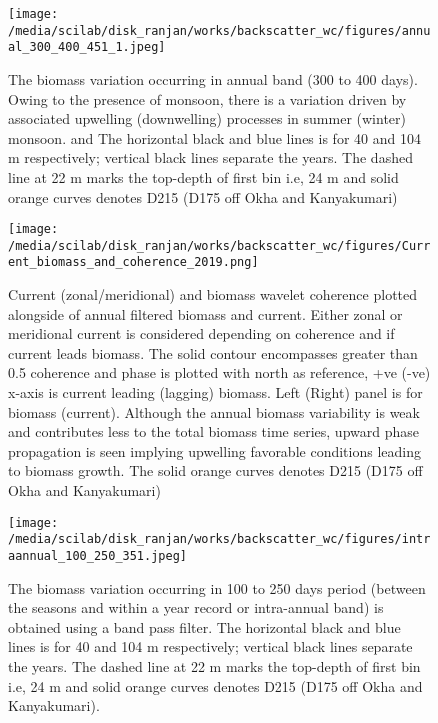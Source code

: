 \documentclass{article}
\begin{document}
\begin{figure}[htbp]
	\centering
	\texttt{[image: /media/scilab/disk\_ranjan/works/backscatter\_wc/figures/annual\_300\_400\_451\_1.jpeg]} 
	\captionsetup{justification=justified,font=footnotesize,skip=0.05\baselineskip,width=\textwidth}
	\caption{The biomass variation occurring in annual band (300 to 400 days). Owing to the presence of monsoon, there is a variation driven by associated upwelling (downwelling) processes in summer (winter) monsoon. and The horizontal black and blue lines is for 40 and 104 m respectively; vertical black lines separate the years. The dashed line at 22 m marks the top-depth of first bin i.e, 24 m and solid orange curves denotes D215 (D175 off Okha and Kanyakumari)}
	\label{fig:annual}
\end{figure}

\begin{figure}[htbp]
	\centering
	\texttt{[image: /media/scilab/disk\_ranjan/works/backscatter\_wc/figures/Current\_biomass\_and\_coherence\_2019.png]} 
	\captionsetup{justification=justified,font=footnotesize,skip=0.05\baselineskip,width=\textwidth}
	\caption{Current (zonal/meridional) and biomass wavelet coherence plotted alongside of annual filtered biomass and current. Either zonal or meridional current is considered depending on coherence and if current leads biomass. The solid contour encompasses greater than 0.5 coherence and phase is plotted with north as reference, +ve (-ve) x-axis is current leading (lagging) biomass. Left (Right) panel is for biomass (current). Although the annual biomass variability is weak and contributes less to the total biomass time series, upward phase propagation is seen implying upwelling favorable conditions leading to biomass growth. The solid orange curves denotes D215 (D175 off Okha and Kanyakumari)}
	\label{fig:biomasscurrentcoh}
\end{figure}


\begin{figure}[htbp]
	\centering
	\texttt{[image: /media/scilab/disk\_ranjan/works/backscatter\_wc/figures/intraannual\_100\_250\_351.jpeg]} 
	\captionsetup{justification=justified,font=footnotesize,skip=0.05\baselineskip,width=\textwidth}
	\caption{The biomass variation occurring in 100 to 250 days period (between the seasons and within a year record or intra-annual band) is obtained using a band pass filter. The horizontal black and blue lines is for 40 and 104 m respectively; vertical black lines separate the years. The dashed line at 22 m marks the top-depth of first bin i.e, 24 m and solid orange curves denotes D215 (D175 off Okha and Kanyakumari). }
	\label{fig:intraannual}
\end{figure}
\end{document}
